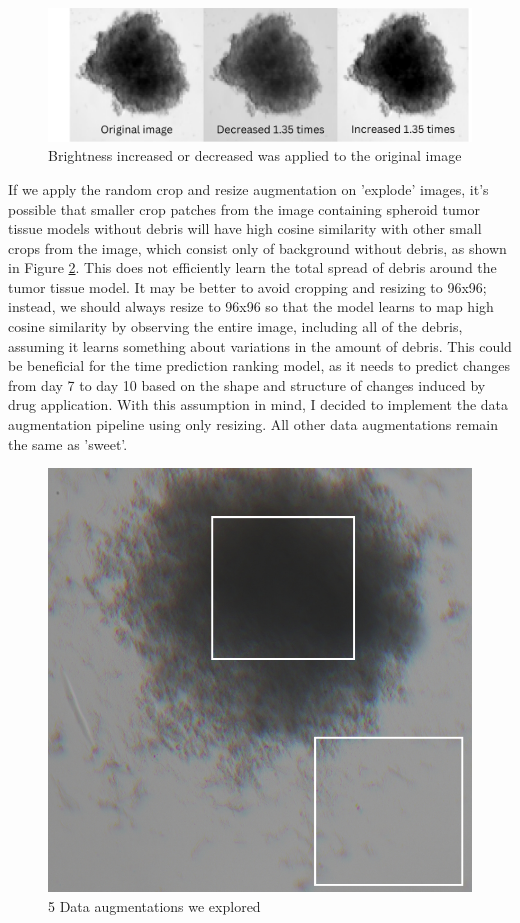   \begin{figure}[H]
    \centering
    \includegraphics[scale=0.3]{figures/contra.png} 
    \caption{Brightness increased or decreased was applied to the original image}
    \label{fig:contra}
  \end{figure}

  If we apply the random crop and resize augmentation on 'explode' images, it's possible that smaller crop patches from the image containing spheroid tumor tissue models without debris will have high cosine similarity with other small crops from the image, which consist only of background without debris, as shown in Figure \ref{fig:expo}. This does not efficiently learn the total spread of debris around the tumor tissue model. It may be better to avoid cropping and resizing to 96x96; instead, we should always resize to 96x96 so that the model learns to map high cosine similarity by observing the entire image, including all of the debris, assuming it learns something about variations in the amount of debris. This could be beneficial for the time prediction ranking model, as it needs to predict changes from day 7 to day 10 based on the shape and structure of changes induced by drug application. With this assumption in mind, I decided to implement the data augmentation pipeline using only resizing. All other data augmentations remain the same as 'sweet'. 

\begin{figure}[H]
  \centering
  \includegraphics[scale=0.3]{figures/expos.png} 
  \caption{5 Data augmentations we explored}
  \label{fig:expo}
\end{figure}

